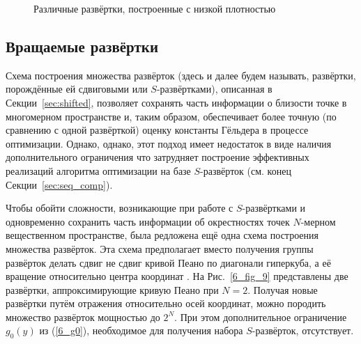 \begin{figure}[ht]
    \centering
    \caption{Различные развёртки, построенные с низкой плотностью}
\end{figure}

\subsection{Вращаемые развёртки}
Схема построения множества развёрток (здесь и далее будем называть, развёртки, порождённые ей сдвиговыми
или $S$-развёртками), описанная в Секции~\ref{sec:shifted}, позволяет сохранять часть информации
о близости точке в многомерном пространстве и, таким образом, обеспечивает более точную (по сравнению с одной развёрткой)
оценку константы Гёльдера в процессе оптимизации. Однако, однако, этот подход имеет недостаток в виде наличия дополнительного ограничения
что затрудняет построение эффективных реализаций алгоритма оптимизации на базе $S$-развёрток (см. конец Секции~\ref{sec:seq_comp}).

Чтобы обойти сложности, возникающие при работе с $S$-развёртками и одновременно сохранить часть информации об окрестностях точек
$N$-мерном вещественном пространстве, была редложена ещё одна схема построения множества развёрток.
Эта схема предполагает вместо получения группы развёрток делать сдвиг не сдвиг кривой Пеано по диагонали гиперкуба, а
её вращение относительно центра координат \cite{Gergel2009}.
На Рис.~\ref{6_fig_9} представлены две развёртки, аппроксимирующие кривую Пеано при $N=2$.
Получая новые развёртки путём отражения относительно осей координат, можно породить множество развёрток
мощностью до $2^N$. При этом дополнительное ограничение $g_0(y)$ из (\ref{6_g0}), необходимое для получения
набора $S$-развёрток, отсутствует.

